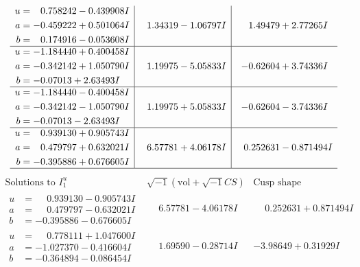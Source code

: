 \documentclass[1p]{elsarticle_modified}
\theoremstyle{definition}
\newcommand{\I}{\sqrt{-1}}
\begin{document}
$$\begin{array}{c|c|c}
\begin{aligned}
u &= \phantom{-}0.758242 - 0.439908 I \\
a &= -0.459222 + 0.501064 I \\
b &= \phantom{-}0.174916 - 0.053608 I\end{aligned}
 & \phantom{-}1.34319 - 1.06797 I & \phantom{-}1.49479 + 2.77265 I \\ \hline\begin{aligned}
u &= -1.184440 + 0.400458 I \\
a &= -0.342142 + 1.050790 I \\
b &= -0.07013 + 2.63493 I\end{aligned}
 & \phantom{-}1.19975 - 5.05833 I & -0.62604 + 3.74336 I \\ \hline\begin{aligned}
u &= -1.184440 - 0.400458 I \\
a &= -0.342142 - 1.050790 I \\
b &= -0.07013 - 2.63493 I\end{aligned}
 & \phantom{-}1.19975 + 5.05833 I & -0.62604 - 3.74336 I \\ \hline\begin{aligned}
u &= \phantom{-}0.939130 + 0.905743 I \\
a &= \phantom{-}0.479797 + 0.632021 I \\
b &= -0.395886 + 0.676605 I\end{aligned}
 & \phantom{-}6.57781 + 4.06178 I & \phantom{-}0.252631 - 0.871494 I\\
 \hline 
 \end{array}$$\newpage$$\begin{array}{c|c|c}  
\text{Solutions to }I^u_{1}& \I (\text{vol} + \sqrt{-1}CS) & \text{Cusp shape}\\
 \hline 
\begin{aligned}
u &= \phantom{-}0.939130 - 0.905743 I \\
a &= \phantom{-}0.479797 - 0.632021 I \\
b &= -0.395886 - 0.676605 I\end{aligned}
 & \phantom{-}6.57781 - 4.06178 I & \phantom{-}0.252631 + 0.871494 I \\ \hline\begin{aligned}
u &= \phantom{-}0.778111 + 1.047600 I \\
a &= -1.027370 - 0.416604 I \\
b &= -0.364894 - 0.086454 I\end{aligned}
 & \phantom{-}1.69590 - 0.28714 I & -3.98649 + 0.31929 I \\ \hline\begin{aligned}

\end{aligned}
\end{array}$$
\end{document}
